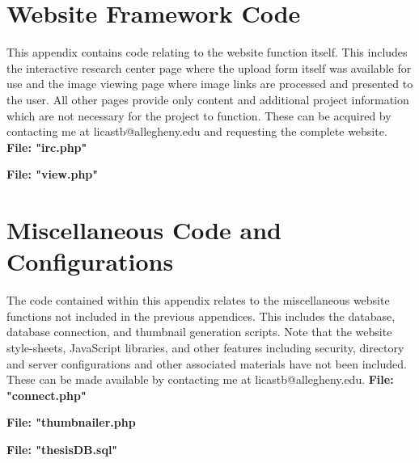 \chapter{Website Framework Code}\label{appb:wejbcode}
This appendix contains code relating to the website function itself. This includes the interactive research center page where the upload form itself was available for use and the image viewing page where image links are processed and presented to the user. All other pages provide only content and additional project information which are not necessary for the project to function. These can be acquired by contacting me at licastb@allegheny.edu and requesting the complete website.
\textbf{File: "irc.php"}

\newpage
\textbf{File: "view.php"}

\newpage

\chapter{Miscellaneous Code and Configurations}\label{appc:misccode}
The code contained within this appendix relates to the miscellaneous website functions not included in the previous appendices. This includes the database, database connection, and thumbnail generation scripts. Note that the website style-sheets, JavaScript libraries, and other features including security, directory and server configurations and other associated materials have not been included. These can be made available by contacting me at licastb@allegheny.edu.
\textbf{File: "connect.php"}

\newpage
\textbf{File: "thumbnailer.php}

\newpage


\textbf{File: "thesisDB.sql"}

\newpage